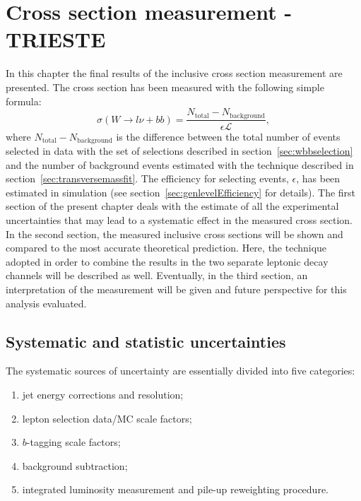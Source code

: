 \section{Cross section measurement - TRIESTE}
\label{sec:xsections}

In this chapter the final results of the inclusive cross section measurement 
are presented.
The cross section has been measured with the following simple formula:
$$ \sigma (W \rightarrow l \nu + bb) = \frac{N_{\mathrm{total}} - N_{\mathrm{background}}}{\epsilon \mathcal{L}} \mathrm{,}$$
where $N_{\mathrm{total}} - N_{\mathrm{background}}$ is the difference between 
the total number of events selected in data with the set of selections described in 
section~\ref{sec:wbbselection} and the number of background events estimated with 
the technique described in section~\ref{sec:transversemassfit}.
The efficiency for selecting events, $\epsilon$,
has been estimated in simulation (see section~\ref{sec:genlevelEfficiency} for details).
The first section of the present chapter 
deals with the estimate of all the experimental 
uncertainties that may lead to a systematic effect in the measured cross 
section. In the second section, the measured inclusive 
cross sections will be shown and compared to the most accurate 
theoretical prediction. Here, the technique adopted in order to 
combine the results in the two separate leptonic decay channels will 
be described as well.
Eventually, in the third section, an interpretation of the measurement 
will be given and future perspective for this analysis evaluated.

\subsection{Systematic and statistic uncertainties}
\label{sec:systunc}

The systematic sources of uncertainty are essentially divided into
five categories:
\begin{enumerate}
   \item jet energy corrections and resolution;
   \item lepton selection data/MC scale factors;
   \item $b$-tagging scale factors;
   \item background subtraction; 
   \item integrated luminosity measurement and pile-up reweighting procedure.
\end{enumerate}

